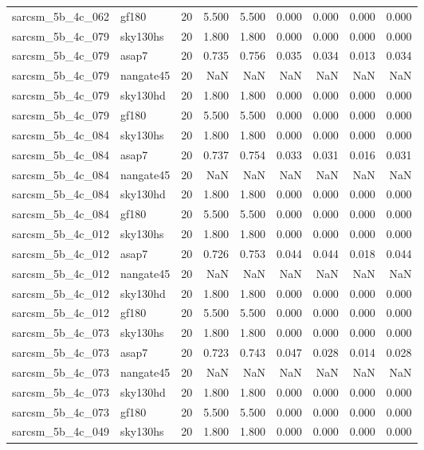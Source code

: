 \begin{tabular}{llrrrrrrr}
sarcsm\_5b\_4c\_062 & gf180 & 20 & 5.500 & 5.500 & 0.000 & 0.000 & 0.000 & 0.000 \\
sarcsm\_5b\_4c\_079 & sky130hs & 20 & 1.800 & 1.800 & 0.000 & 0.000 & 0.000 & 0.000 \\
sarcsm\_5b\_4c\_079 & asap7 & 20 & 0.735 & 0.756 & 0.035 & 0.034 & 0.013 & 0.034 \\
sarcsm\_5b\_4c\_079 & nangate45 & 20 & NaN & NaN & NaN & NaN & NaN & NaN \\
sarcsm\_5b\_4c\_079 & sky130hd & 20 & 1.800 & 1.800 & 0.000 & 0.000 & 0.000 & 0.000 \\
sarcsm\_5b\_4c\_079 & gf180 & 20 & 5.500 & 5.500 & 0.000 & 0.000 & 0.000 & 0.000 \\
sarcsm\_5b\_4c\_084 & sky130hs & 20 & 1.800 & 1.800 & 0.000 & 0.000 & 0.000 & 0.000 \\
sarcsm\_5b\_4c\_084 & asap7 & 20 & 0.737 & 0.754 & 0.033 & 0.031 & 0.016 & 0.031 \\
sarcsm\_5b\_4c\_084 & nangate45 & 20 & NaN & NaN & NaN & NaN & NaN & NaN \\
sarcsm\_5b\_4c\_084 & sky130hd & 20 & 1.800 & 1.800 & 0.000 & 0.000 & 0.000 & 0.000 \\
sarcsm\_5b\_4c\_084 & gf180 & 20 & 5.500 & 5.500 & 0.000 & 0.000 & 0.000 & 0.000 \\
sarcsm\_5b\_4c\_012 & sky130hs & 20 & 1.800 & 1.800 & 0.000 & 0.000 & 0.000 & 0.000 \\
sarcsm\_5b\_4c\_012 & asap7 & 20 & 0.726 & 0.753 & 0.044 & 0.044 & 0.018 & 0.044 \\
sarcsm\_5b\_4c\_012 & nangate45 & 20 & NaN & NaN & NaN & NaN & NaN & NaN \\
sarcsm\_5b\_4c\_012 & sky130hd & 20 & 1.800 & 1.800 & 0.000 & 0.000 & 0.000 & 0.000 \\
sarcsm\_5b\_4c\_012 & gf180 & 20 & 5.500 & 5.500 & 0.000 & 0.000 & 0.000 & 0.000 \\
sarcsm\_5b\_4c\_073 & sky130hs & 20 & 1.800 & 1.800 & 0.000 & 0.000 & 0.000 & 0.000 \\
sarcsm\_5b\_4c\_073 & asap7 & 20 & 0.723 & 0.743 & 0.047 & 0.028 & 0.014 & 0.028 \\
sarcsm\_5b\_4c\_073 & nangate45 & 20 & NaN & NaN & NaN & NaN & NaN & NaN \\
sarcsm\_5b\_4c\_073 & sky130hd & 20 & 1.800 & 1.800 & 0.000 & 0.000 & 0.000 & 0.000 \\
sarcsm\_5b\_4c\_073 & gf180 & 20 & 5.500 & 5.500 & 0.000 & 0.000 & 0.000 & 0.000 \\
sarcsm\_5b\_4c\_049 & sky130hs & 20 & 1.800 & 1.800 & 0.000 & 0.000 & 0.000 & 0.000 \\

\end{tabular}
